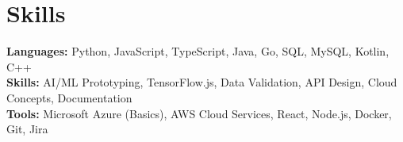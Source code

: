 \documentclass[11pt]{article}       %
\begin{document}

\vspace{-18.5pt}


\section*{Skills}
\textbf{Languages:} Python, JavaScript, TypeScript, Java, Go, SQL, MySQL, Kotlin, C++\\
\textbf{Skills:} AI/ML Prototyping, TensorFlow.js, Data Validation, API Design, Cloud Concepts, Documentation\\
\textbf{Tools:} Microsoft Azure (Basics), AWS Cloud Services, React, Node.js, Docker, Git, Jira\\

\vspace{-6.5pt}
\end{document}
